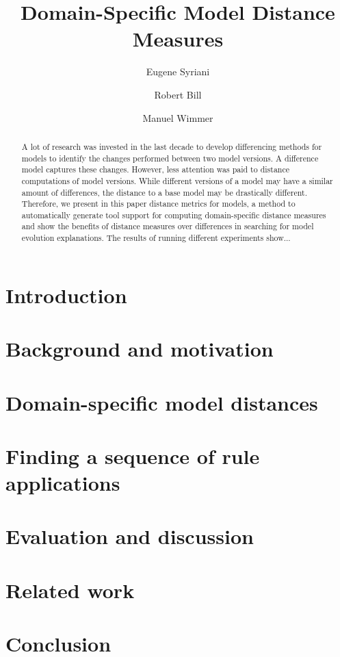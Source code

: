 \documentclass{llncs}
\newcommand\es[1]{\nb{ES}{\textcolor{red}{\textsl{#1}}}}
\begin{document}
\title{Domain-Specific Model Distance Measures}

\author{Eugene Syriani \and Robert Bill  \and Manuel Wimmer}

\maketitle

\begin{abstract}
A lot of research was invested in the last decade to develop differencing methods for models to identify the changes performed between two model versions.
A difference model captures these changes. However, less attention was paid to distance computations of model versions. While different versions of a model may have a similar amount of differences,
the distance to a base model may be drastically different. Therefore, we present in this paper distance metrics for models, a method to automatically generate tool support for computing domain-specific distance measures and show the benefits of distance measures over differences in searching for model evolution explanations. The results of running different experiments show...\es{todo}
\end{abstract}


\section{Introduction}\label{sec:intro}


\section{Background and motivation}\label{sec:background}


\section{Domain-specific model distances}\label{sec:metrics}


\section{Finding a sequence of rule applications}\label{sec:momot}


\section{Evaluation and discussion}\label{sec:eval}


\section{Related work}\label{sec:rw}


\section{Conclusion}\label{sec:conclusion}




\end{document}
